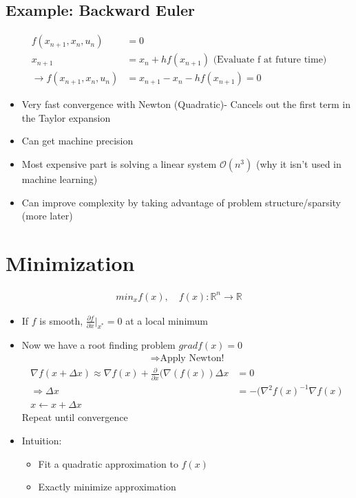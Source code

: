 \documentclass[11pt]{article}
\begin{document}
\subsection{Example: Backward Euler}
\begin{align*}
    f(x_{n+1}, x_n, u_n) &= 0
    \\
    x_{n+1} &= x_n + hf(x_{n+1}) \text{ (Evaluate f at future time)}
    \\
    \rightarrow f(x_{n+1},x_n,u_n) &= x_{n+1} - x_n - hf(x_{n+1}) = 0
\end{align*}
\begin{itemize}
    \item Very fast convergence with Newton (Quadratic)- Cancels out the first term in the Taylor expansion
    \item Can get machine precision
    \item Most expensive part is solving a linear system $\mathcal{O}(n^3)$ (why it isn't used in machine learning)
    \item Can improve complexity by taking advantage of problem structure/sparsity (more later)
\end{itemize}

\section{Minimization}
\begin{align*}
    min_x f(x), \quad f(x): \mathbb{R}^n \rightarrow \mathbb{R}
\end{align*}
\begin{itemize}
    \item If $f$ is smooth, $\frac{\partial f}{\partial x}|_{x^*} = 0$ at a local minimum
    \item Now we have a root finding problem $grad f(x) = 0$
    \begin{align*}
        \Rightarrow \text{Apply Newton!}
    \end{align*}
    \begin{align*}
        \nabla f(x+\Delta x) \approx \nabla f(x) + \frac{\partial}{\partial x}(\nabla(f(x))\Delta x &= 0
        \\
        \Rightarrow \Delta x &= -(\nabla^2 f(x)^{-1}\nabla f(x)
        \\
        x \leftarrow x + \Delta x
    \end{align*}
    Repeat until convergence
    \item Intuition:
    \begin{itemize}
        \item Fit a quadratic approximation to $f(x)$
        \item Exactly minimize approximation
    \end{itemize}
\end{itemize}
\end{document}

